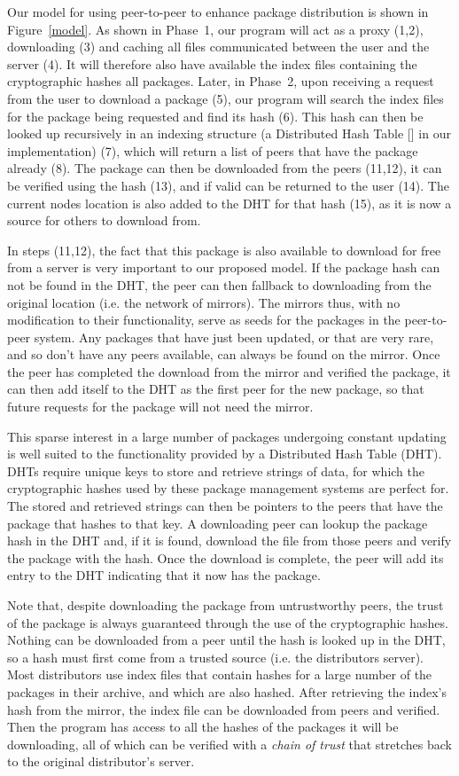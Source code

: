 \documentclass[conference]{IEEEtran}
\begin{document}
Our model for using peer-to-peer to enhance package distribution is shown in
Figure~\ref{model}. As shown in Phase~1, our program will act as a
proxy (1,2), downloading (3) and caching all files communicated
between the user and the server (4). It will therefore also have
available the index files containing the cryptographic hashes all
packages. Later, in Phase~2, upon receiving a request from the user
to download a package (5), our program will search the index files
for the package being requested and find its hash (6). This hash can
then be looked up recursively in an indexing structure (a Distributed Hash Table [] in our implementation) (7), which will return a
list of peers that have the package already (8). The package can
then be downloaded from the peers (11,12), it can be verified using
the hash (13), and if valid can be returned to the user (14). The
current nodes location is also added to the DHT for that hash (15),
as it is now a source for others to download from.

In steps (11,12), the fact that this package is also available to download for free
from a server is very important to our proposed model. If the package hash
can not be found in the DHT, the peer can then fallback to
downloading from the original location (i.e. the network of
mirrors). The mirrors thus, with no modification to their
functionality, serve as seeds for the packages in the peer-to-peer
system. Any packages that have just been updated, or that are very
rare, and so don't have any peers available, can always be found on
the mirror. Once the peer has completed the download from the mirror
and verified the package, it can then add itself to the DHT as the
first peer for the new package, so that future requests for the package
will not need the mirror.

This sparse
interest in a large number of packages undergoing constant updating
is well suited to the functionality provided by a Distributed Hash
Table (DHT). DHTs require unique keys to store and retrieve strings
of data, for which the cryptographic hashes used by these package
management systems are perfect for. The stored and retrieved strings
can then be pointers to the peers that have the package that hashes
to that key. A downloading peer can lookup the package hash in the
DHT and, if it is found, download the file from those peers and
verify the package with the hash. Once the download is complete, the
peer will add its entry to the DHT indicating that it now has the
package.

Note that, despite downloading the package from untrustworthy peers,
the trust of the package is always guaranteed through the use
of the cryptographic hashes. Nothing can be downloaded from a peer
until the hash is looked up in the DHT, so a hash must first come
from a trusted source (i.e. the distributors server). Most distributors use index
files that contain hashes for a large number of the packages in
their archive, and which are also hashed. After retrieving the
index's hash from the mirror, the index file can be downloaded from
peers and verified. Then the program has access to all the hashes of
the packages it will be downloading, all of which can be verified
with a \emph{chain of trust} that stretches back to the original
distributor's server.
\end{document}
